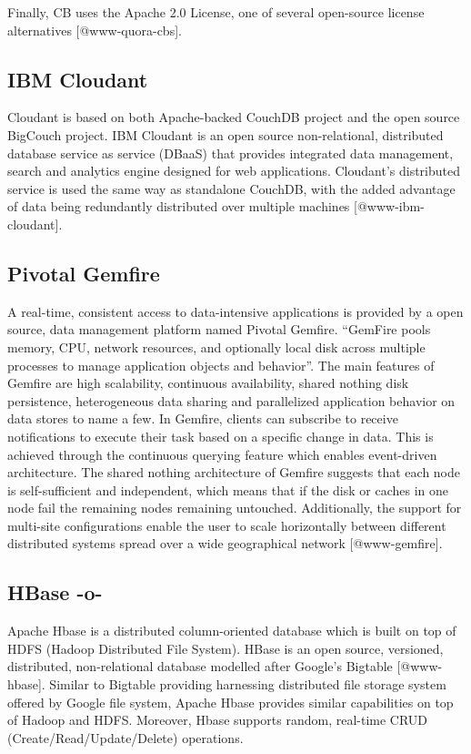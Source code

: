 Finally, CB uses the Apache 2.0 License, one of several open-source
license alternatives [@www-quora-cbs].




\subsection{IBM Cloudant}
     
Cloudant is based on both Apache-backed CouchDB project and the open
source BigCouch project. IBM Cloudant is an open source
non-relational, distributed database service as service (DBaaS) that
provides integrated data management, search and analytics engine
designed for web applications. Cloudant's distributed service is used
the same way as standalone CouchDB, with the added advantage of data
being redundantly distributed over multiple
machines [@www-ibm-cloudant].
   

\subsection{Pivotal Gemfire}
     
A real-time, consistent access to data-intensive applications is
provided by a open source, data management platform named Pivotal
Gemfire. ``GemFire pools memory, CPU, network resources, and
optionally local disk across multiple processes to manage application
objects and behavior''. The main features of Gemfire are high
scalability, continuous availability, shared nothing disk persistence,
heterogeneous data sharing and parallelized application behavior on
data stores to name a few.  In Gemfire, clients can subscribe to
receive notifications to execute their task based on a specific change
in data. This is achieved through the continuous querying feature
which enables event-driven architecture. The shared nothing
architecture of Gemfire suggests that each node is self-sufficient and
independent, which means that if the disk or caches in one node fail
the remaining nodes remaining untouched. Additionally, the support for
multi-site configurations enable the user to scale horizontally
between different distributed systems spread over a wide geographical
network [@www-gemfire].
     
\subsection{HBase -o-}

Apache Hbase is a distributed column-oriented database which is built
on top of HDFS (Hadoop Distributed File System). HBase is an open
source, versioned, distributed, non-relational database modelled after
Google's Bigtable [@www-hbase]. Similar to Bigtable providing
harnessing distributed file storage system offered by Google file
system, Apache Hbase provides similar capabilities on top of Hadoop
and HDFS. Moreover, Hbase supports random, real-time CRUD
(Create/Read/Update/Delete) operations.


